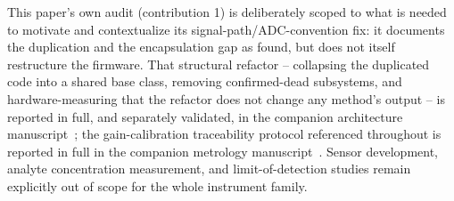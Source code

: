 This paper's own audit (contribution 1) is deliberately scoped to what is
needed to motivate and contextualize its signal-path/ADC-convention fix:
it documents the duplication and the encapsulation gap as found, but does
not itself restructure the firmware. That structural refactor -- collapsing
the duplicated code into a shared base class, removing confirmed-dead
subsystems, and hardware-measuring that the refactor does not change any
method's output -- is reported in full, and separately validated, in the
companion architecture manuscript~\cite{clement2026architecture}; the
gain-calibration traceability protocol referenced throughout is reported
in full in the companion metrology manuscript~\cite{clement2026linearity}.
Sensor development, analyte concentration measurement, and
limit-of-detection studies remain explicitly out of scope for the whole
instrument family.
